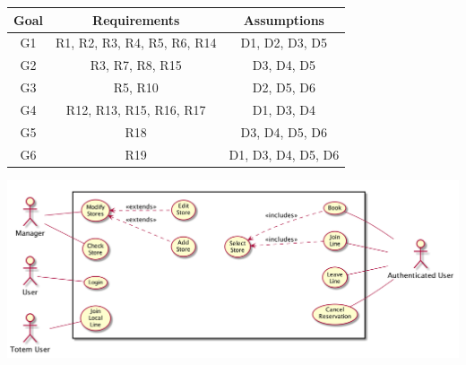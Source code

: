 \begin{center}
    \begin{tabular}{ |c||c|c| }
        \hline
        \textbf{Goal} & \textbf{Requirements} & \textbf{Assumptions} \\
        \hline
        G1 & R1, R2, R3, R4, R5, R6, R14 & D1, D2, D3, D5 \\ %
        \hline
        G2 & R3, R7, R8, R15 & D3, D4, D5 \\ %
        \hline
        G3 & R5, R10 & D2, D5, D6\\ %
        \hline
        G4 & R12, R13, R15, R16, R17 & D1, D3, D4 \\ %
        \hline
        G5 & R18 & D3, D4, D5, D6 \\ %
        \hline
        G6 & R19 & D1, D3, D4, D5, D6 \\ %
        \hline
    \end{tabular}
\end{center}

\begin{center}
    \includegraphics[width=\textwidth]{uml/usecase.png}
\end{center}



